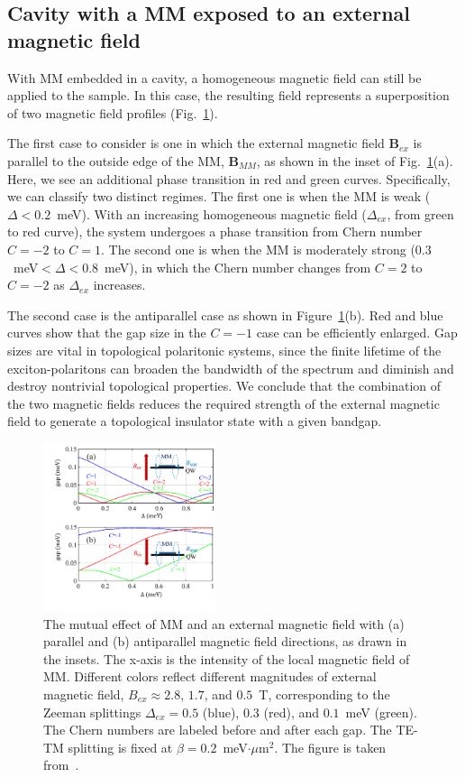 
\subsection{Cavity with a MM exposed to an external magnetic field}
With MM embedded in a cavity, a homogeneous magnetic field can still be applied to the sample. In this case, the resulting field represents a superposition of two magnetic field profiles (Fig.~\ref{fig:Ch5_fig4}).

The first case to consider is one in which the external magnetic field $\mathbf{B}_{ex}$ is parallel to the outside edge of the MM, $\mathbf{B}_{MM}$, as shown in the inset of Fig.~\ref{fig:Ch5_fig4}(a).
Here, we see an additional phase transition in red and green curves.
Specifically, we can classify two distinct regimes.
The first one is when the MM is weak ($\Delta < 0.2$~meV). With an increasing homogeneous magnetic field ($\Delta_{ex}$, from green to red curve), the system undergoes a phase transition from Chern number $C=-2$ to $C=1$.
The second one is when the MM is moderately strong ($0.3$~meV$<\Delta<0.8$~meV), in which the Chern number changes from $C=2$ to $C=-2$ as $\Delta_{ex}$ increases.

The second case is the antiparallel case as shown in Figure~\ref{fig:Ch5_fig4}(b).
Red and blue curves show that the gap size in the $C=-1$ case can be efficiently enlarged.
Gap sizes are vital in topological polaritonic systems, since the finite lifetime of the exciton-polaritons can broaden the bandwidth of the spectrum and diminish and destroy nontrivial topological properties.
We conclude that the combination of the two magnetic fields reduces the required strength of the external magnetic field to generate a topological insulator state with a given bandgap.
%
%
%
\begin{figure}[ht]
\centering
\includegraphics[width=0.45\textwidth]{Fig/Ch5/Fig4.pdf}
\caption[Bandgap of MM under external magnetic field]{The mutual effect of MM and an external magnetic field with (a) parallel and (b) antiparallel magnetic field directions, as drawn in the insets.
The x-axis is the intensity of the local magnetic field of MM.
Different colors reflect different magnitudes of external magnetic field,
$B_{ex}\approx 2.8$, $1.7$, and $0.5$~T, corresponding to the Zeeman splittings $\Delta_{ex}=0.5$ (blue), $0.3$ (red), and $0.1$~meV (green).
The Chern numbers are labeled before and after each gap.
The TE-TM splitting is fixed at $\beta = 0.2$~meV$\cdot\mu$m$^2$. The figure is taken from~\cite{Sun:2019ab}.}
    \label{fig:Ch5_fig4}
\end{figure}
%
%
%


